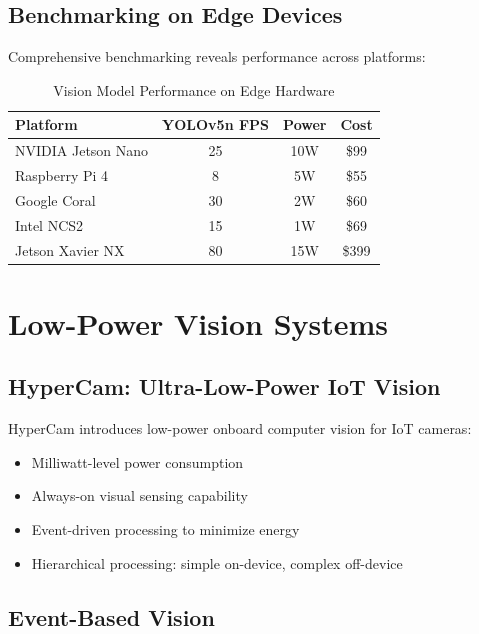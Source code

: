 \documentclass[12pt,a4paper]{article}
\begin{document}
\subsection{Benchmarking on Edge Devices}

Comprehensive benchmarking reveals performance across platforms:

\begin{table}[H]
\centering
\caption{Vision Model Performance on Edge Hardware}
\begin{tabular}{lccc}
\toprule
\textbf{Platform} & \textbf{YOLOv5n FPS} & \textbf{Power} & \textbf{Cost} \\
\midrule
NVIDIA Jetson Nano & 25 & 10W & \$99 \\
Raspberry Pi 4 & 8 & 5W & \$55 \\
Google Coral & 30 & 2W & \$60 \\
Intel NCS2 & 15 & 1W & \$69 \\
Jetson Xavier NX & 80 & 15W & \$399 \\
\bottomrule
\end{tabular}
\end{table}

\section{Low-Power Vision Systems}

\subsection{HyperCam: Ultra-Low-Power IoT Vision}

HyperCam introduces low-power onboard computer vision for IoT cameras:
\begin{itemize}
    \item Milliwatt-level power consumption
    \item Always-on visual sensing capability
    \item Event-driven processing to minimize energy
    \item Hierarchical processing: simple on-device, complex off-device
\end{itemize}

\subsection{Event-Based Vision}
\end{document}
